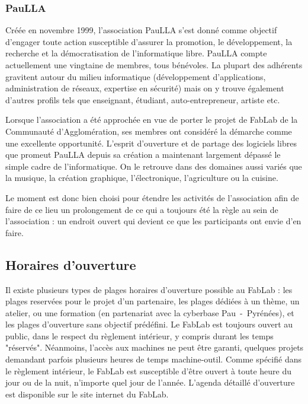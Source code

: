 \subsubsection{PauLLA}
Créée en novembre 1999, l'association PauLLA s'est donné comme objectif d'engager toute action susceptible d'assurer la promotion, le développement, la recherche et la démocratisation de l'informatique libre.
PauLLA compte actuellement une vingtaine de membres, tous bénévoles. La plupart des adhérents gravitent autour du milieu informatique (développement d'applications, administration de réseaux, expertise en sécurité) mais on y trouve également d'autres profils tels que enseignant, étudiant, auto-entrepreneur, artiste etc.

Lorsque l'association a été approchée en vue de porter le projet de FabLab de la Communauté d'Agglomération, ses membres ont considéré la démarche comme une excellente opportunité.
L'esprit d'ouverture et de partage des logiciels libres que promeut PauLLA depuis sa création a maintenant largement dépassé le simple cadre de l'informatique. On le retrouve dans des domaines aussi variés que la musique, la création graphique, l'électronique, l'agriculture ou la cuisine.

Le moment est donc bien choisi pour étendre les activités de l'association afin de faire de ce lieu un prolongement de ce qui a toujours été la règle au sein de l'association : un endroit ouvert qui devient ce que les participants ont envie d'en faire.

\subsection{Horaires d'ouverture}
Il existe plusieurs types de plages horaires d'ouverture possible au FabLab : les plages reservées pour le projet d'un partenaire, les plages dédiées à un thème, un atelier, ou une formation (en partenariat avec la cyberbase Pau~-~Pyrénées), et les plages d'ouverture sans objectif prédéfini.
Le FabLab est toujours ouvert au public, dans le respect du règlement intérieur, y compris durant les temps "réservés". Néanmoins, l'accès aux machines ne peut être garanti, quelques projets demandant parfois plusieurs heures de temps machine-outil.
Comme spécifié dans le règlement intérieur, le FabLab est susceptible d'être ouvert à toute heure du jour ou de la nuit, n'importe quel jour de l'année.
L'agenda détaillé d'ouverture est disponible sur le site internet du FabLab. %

